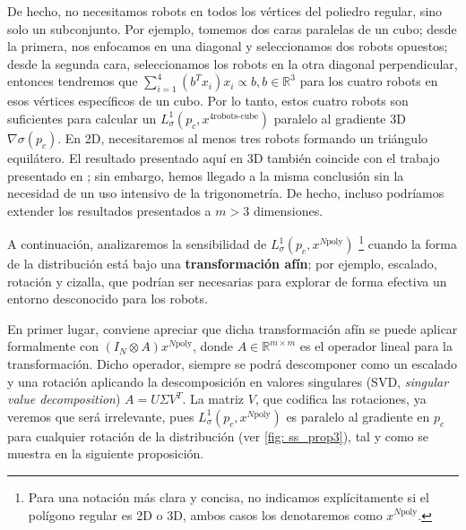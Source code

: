 De hecho, no necesitamos robots en todos los vértices del poliedro regular, sino solo un subconjunto. Por ejemplo, tomemos dos caras paralelas de un cubo; desde la primera, nos enfocamos en una diagonal y seleccionamos dos robots opuestos; desde la segunda cara, seleccionamos los robots en la otra diagonal perpendicular, entonces tendremos que $\sum_{i=1}^4 \left(b^Tx_i\right)x_i \propto b, b\in\mathbb{R}^3$ para los cuatro robots en esos vértices específicos de un cubo. Por lo tanto, estos cuatro robots son suficientes para calcular un $L^1_\sigma(p_c, x^{\text{4robots-cube}})$ paralelo al gradiente 3D $\nabla\sigma(p_c)$. En 2D, necesitaremos al menos tres robots formando un triángulo equilátero. El resultado presentado aquí en 3D también coincide con el trabajo presentado en \cite{brinon2019multirobot}; sin embargo, hemos llegado a la misma conclusión sin la necesidad de un uso intensivo de la trigonometría. De hecho, incluso podríamos extender los resultados presentados a $m>3$ dimensiones.

A continuación, analizaremos la sensibilidad de $L^1_\sigma(p_c, x^{N\text{poly}})$ \footnote{Para una notación más clara y concisa, no indicamos explícitamente 
 si el polígono regular es 2D o 3D, ambos casos los denotaremos como  $x^{N\text{poly}}$.} cuando la forma de la distribución está bajo una \textbf{transformación afín}; por ejemplo, escalado, rotación y cizalla, que podrían ser necesarias para explorar de forma efectiva un entorno desconocido para los robots. 
 
 En primer lugar, conviene apreciar que dicha transformación afín se puede aplicar formalmente con $(I_N \otimes A)x^{N\text{poly}}$, donde $A\in\mathbb{R}^{m\times m}$ es el operador lineal para la transformación. Dicho operador, siempre se podrá descomponer como un escalado y una rotación aplicando la descomposición en valores singulares (SVD, \textit{singular value decomposition}) $A = U\Sigma V^T$. La matriz $V$, que codifica las rotaciones, ya veremos que será irrelevante, pues $L^1_\sigma(p_c, x^{N\text{poly}})$ es paralelo al gradiente en $p_c$ para cualquier rotación de la distribución (ver \autoref{fig: ss_prop3}), tal y como se muestra en la siguiente proposición. 

\vspace{0.2cm}
 
